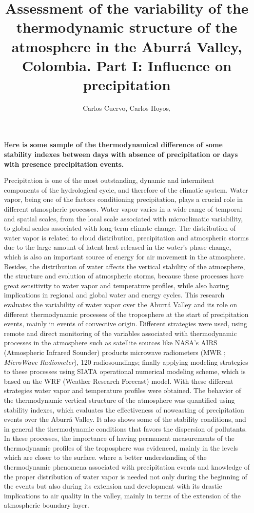 \documentclass[	DIV=calc,%
							paper=a4,%
							fontsize=11pt,%
							twocolumn]{scrartcl}	 					%
\title{Assessment of the variability of the thermodynamic structure of the atmosphere in the Aburrá Valley, Colombia. Part I: Influence on precipitation }
\author{Carlos Cuervo, Carlos Hoyos, }											%
\date{}																				%
\newcommand{\initial}[1]{%
     \lettrine[lines=3,lhang=0.3,nindent=0em]{
     				\color{CiceBlue2}
     				{\textsf{#1}}}{}}
\begin{document}
\maketitle
\thispagestyle{fancy} 			%
\initial{H}\textbf{ere is some sample of the thermodynamical difference of some stability indexes between days with absence of precipitation  or days with presence precipitation events.}

Precipitation is one of the most outstanding, dynamic and intermitent components of the hydrological cycle, and therefore of the climatic system. Water vapor, being one of the factors conditioning precipitation, plays a crucial role in different atmospheric processes. Water vapor varies in a wide range of temporal and spatial scales, from the local scale associated with microclimatic variability, to global scales associated with long-term climate change. The distribution of water vapor is related to cloud distribution, precipitation and atmospheric storms due to the large amount of latent heat released in the water’s phase change, which is also an important source of energy for air movement in the atmosphere. Besides, the distribution of water affects the vertical stability of the atmosphere, the structure and evolution of atmospheric storms, because these processes have great sensitivity to water vapor and temperature profiles, while also having implications in regional and global water and energy cycles. This research evaluates the variability of water vapor over the Aburrá Valley and its role on different thermodynamic processes of the troposphere at the start of precipitation events, mainly in events of convective origin. Different strategies were used, using remote and direct monitoring of the variables associated with thermodynamic processes in the atmosphere such as satellite sources like NASA’s AIRS (Atmospheric Infrared Sounder) products microwave radiometers (MWR ; \textit{MicroWave Radiometer}), 120 radiosoundings; finally applying modeling strategies to these processes using SIATA operational numerical modeling scheme, which is based on the WRF (Weather Research Forecast) model. With these different strategies water vapor and temperature profiles were obtained. The behavior of the thermodynamic vertical structure of the atmosphere was quantified using stability indexes, which evaluates the effectiveness of nowcasting of precipitation events over the Aburrá Valley. It also shows some of the stability conditions, and in general the thermodynamic conditions that favors the dispersion of pollutants. In these processes, the importance of having permanent measurements of the thermodynamic profiles of the troposphere was evidenced, mainly in the levels which are closer to the surface. where a better understanding of the thermodynamic phenomena associated with precipitation events and knowledge of the proper distribution of water vapor is needed not only during the beginning of the events but also during its extension and development with its drastic implications to air quality in the valley, mainly in terms of the extension of the atmospheric boundary layer.
\end{document}
